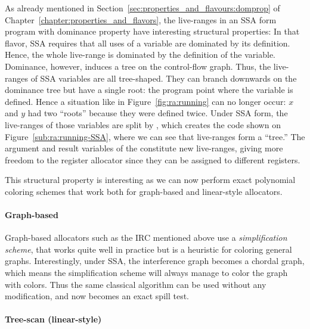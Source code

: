 {

As already mentioned in Section~\ref{sec:properties_and_flavours:domprop} of Chapter~\ref{chapter:properties_and_flavors}, the live-ranges in an SSA form program with dominance property have interesting structural properties:
In that flavor, SSA requires that all uses of a variable are dominated by its definition.
Hence, the whole live-range is dominated by the definition of the variable.
Dominance, however, induces a tree on the control-flow graph.
Thus, the live-ranges of SSA variables are all tree-shaped.
They can branch downwards on the dominance tree but have a single root:
the program point where the variable is defined.
Hence a situation like in Figure~\ref{fig:ra:running} can no longer occur:
$x$ and $y$ had two ``roots'' because they were defined twice.
Under SSA form, the live-ranges of those variables are split by \phifuns, which creates the code shown on Figure~\ref{sub:ra:running-SSA}, where we can see that live-ranges form a ``tree.''
The argument and result variables of the \phifuns constitute new live-ranges, giving more freedom to the register allocator since they can be assigned to different registers.

This structural property is interesting as we can now perform exact polynomial coloring schemes that work both for graph-based and linear-style allocators.


\paragraph{Graph-based} 
Graph-based allocators such as the IRC mentioned above use a \emph{simplification scheme}, that works quite well in practice but is a heuristic for coloring general graphs.
Interestingly, under SSA, the interference graph becomes a chordal graph, which means the simplification scheme will always manage to color the graph with \maxlive colors.
Thus the same classical algorithm can be used without any modification, and now becomes an exact spill test.


\paragraph{Tree-scan (linear-style)}

}
